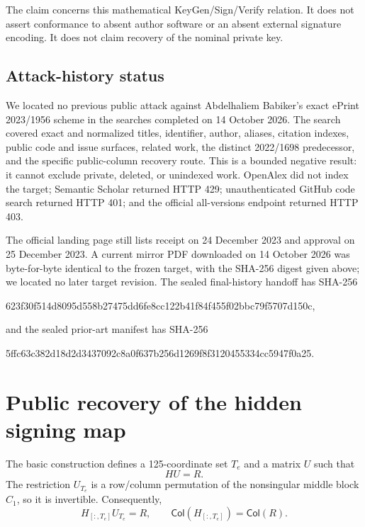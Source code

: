 \documentclass[10pt,a4paper]{article}
\newcommand{\Col}{\mathsf{Col}}
\begin{document}
The claim concerns this mathematical KeyGen/Sign/Verify relation. It does not
assert conformance to absent author software or an absent external signature
encoding. It does not claim recovery of the nominal private key.

\subsection{Attack-history status}

We located no previous public attack against Abdelhaliem Babiker's exact
ePrint 2023/1956 scheme in the searches completed on 14 October 2026. The
search covered exact and normalized titles, identifier, author, aliases,
citation indexes, public code and issue surfaces, related work, the distinct
2022/1698 predecessor, and the specific public-column recovery route. This is
a bounded negative result: it cannot exclude private, deleted, or unindexed
work. OpenAlex did not index the target; Semantic Scholar returned HTTP 429;
unauthenticated GitHub code search returned HTTP 401; and the official
all-versions endpoint returned HTTP 403.

The official landing page still lists receipt on 24 December 2023 and approval
on 25 December 2023. A current mirror PDF downloaded on 14 October 2026 was
byte-for-byte identical to the frozen target, with the SHA-256 digest given
above; we located no later target revision. The sealed final-history handoff
has SHA-256
\begin{center}
\small\ttfamily
623f30f514d8095d558b27475dd6fe8cc122b41f84f455f02bbc79f5707d150c,
\end{center}
and the sealed prior-art manifest has SHA-256
\begin{center}
\small\ttfamily
5ffc63c382d18d2d3437092c8a0f637b256d1269f8f3120455334cc5947f0a25.
\end{center}

\section{Public recovery of the hidden signing map}

The basic construction defines a 125-coordinate set $T_e$ and a matrix $U$
such that
\begin{equation}
  HU=R.
  \label{eq:basic}
\end{equation}
The restriction $U_{T_e}$ is a row/column permutation of the nonsingular
middle block $C_1$, so it is invertible. Consequently,
\begin{equation}
  H_{[:,T_e]}U_{T_e}=R,
  \qquad
  \Col(H_{[:,T_e]})=\Col(R).
  \label{eq:span}
\end{equation}
\end{document}

